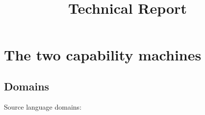 \documentclass[a3paper]{article}
\title{Technical Report}
\newcommand\lau[1]{{\color{purple} \sf \footnotesize {LS: #1}}\\}
\newcommand\dominique[1]{{\color{purple} \sf \footnotesize {DD: #1}}\\}
\begin{document}
\maketitle
\tableofcontents
\section{The two capability machines}
\subsection{Domains}
\label{sec:domains}

Source language domains:
\end{document}
